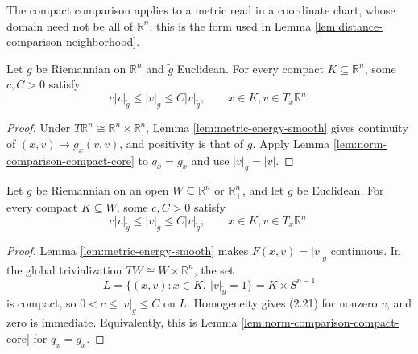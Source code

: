 The compact comparison applies to a metric read in a coordinate chart, whose domain need not be all of $\mathbb R^n$; this is the form used in Lemma \ref{lem:distance-comparison-neighborhood}.

\begin{lemma}
\label{lem:riemannian-euclidean-norm-comparison-flat}
\leanok
{}
Let $g$ be Riemannian on $\mathbb R^n$ and $\widetilde g$ Euclidean. For every compact $K\subseteq\mathbb R^n$, some $c,C>0$ satisfy
\[
c|v|_{\widetilde g}\le|v|_g\le C|v|_{\widetilde g},
\qquad x\in K, v\in T_x\mathbb R^n.
\]
\end{lemma}
\begin{proof}
\leanok
{}
\sketch Under $T\mathbb R^n\cong\mathbb R^n\times\mathbb R^n$, Lemma \ref{lem:metric-energy-smooth} gives continuity of $(x,v)\mapsto g_x(v,v)$, and positivity is that of $g$. Apply Lemma \ref{lem:norm-comparison-compact-core} to $q_x=g_x$ and use $|v|_{\widetilde g}=|v|$.
\end{proof}

\begin{lemma}
\label{lem:riemannian-euclidean-norm-comparison}
\leanok
{}
Let $g$ be Riemannian on an open $W\subseteq\mathbb R^n$ or $\mathbb R^n_+$, and let $\widetilde g$ be Euclidean. For every compact $K\subseteq W$, some $c,C>0$ satisfy
\begin{equation}
c|v|_{\widetilde g}\le|v|_g\le C|v|_{\widetilde g},
\qquad x\in K, v\in T_x\mathbb R^n.
\tag{2.21}
\end{equation}
\end{lemma}
\begin{proof}
\leanok
{}
\sketch Lemma \ref{lem:metric-energy-smooth} makes $F(x,v)=|v|_g$ continuous. In the global trivialization $TW\cong W\times\mathbb R^n$, the set
\[
L=\{(x,v):x\in K,\ |v|_{\widetilde g}=1\}=K\times S^{n-1}
\]
is compact, so $0<c\le|v|_g\le C$ on $L$. Homogeneity gives (2.21) for nonzero $v$, and zero is immediate. Equivalently, this is Lemma \ref{lem:norm-comparison-compact-core} for $q_x=g_x$.
\end{proof}

